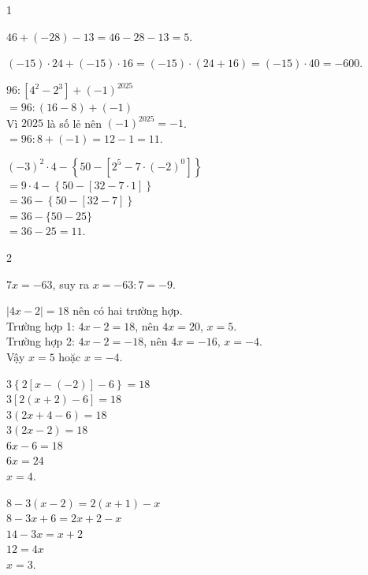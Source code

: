\begin{Solbook}{1}
 \par \noindent  \begin {listEX} \item $46+(-28)-13=46-28-13=5$. \item $(-15)\cdot 24+(-15)\cdot 16=(-15)\cdot (24+16)=(-15)\cdot 40=-600$. \item $96:\left [4^{2}-2^{3}\right ]+(-1)^{2025}$\\ $=96:(16-8)+(-1)$\\ Vì $2025$ là số lẻ nên $(-1)^{2025}=-1$.\\ $=96:8+(-1)=12-1=11$. \item $(-3)^{2}\cdot 4-\left \{50-\left [2^{5}-7\cdot (-2)^{0}\right ]\right \}$\\ $=9\cdot 4-\left \{50-\left [32-7\cdot 1\right ]\right \}$\\ $=36-\left \{50-[32-7]\right \}$\\ $=36-\{50-25\}$\\ $=36-25=11$. \end {listEX}  \hfill \qedEX 
\end{Solbook}
\begin{Solbook}{2}
 \par \noindent  \begin {listEX} \item $7x=-63$, suy ra $x=-63:7=-9$. \item $|4x-2|=18$ nên có hai trường hợp.\\ Trường hợp 1: $4x-2=18$, nên $4x=20$, $x=5$.\\ Trường hợp 2: $4x-2=-18$, nên $4x=-16$, $x=-4$.\\ Vậy $x=5$ hoặc $x=-4$. \item $3\left \{2\left [x-(-2)\right ]-6\right \}=18$\\ $3\left [2(x+2)-6\right ]=18$\\ $3(2x+4-6)=18$\\ $3(2x-2)=18$\\ $6x-6=18$\\ $6x=24$\\ $x=4$. \item $8-3(x-2)=2(x+1)-x$\\ $8-3x+6=2x+2-x$\\ $14-3x=x+2$\\ $12=4x$\\ $x=3$. \end {listEX}  \hfill \qedEX 
\end{Solbook}
